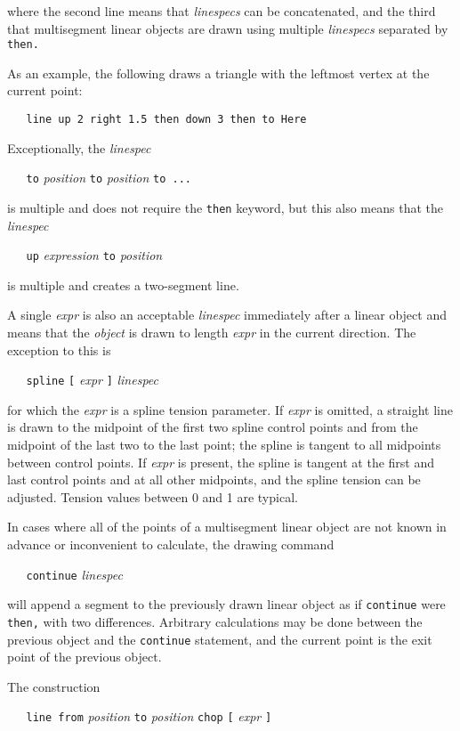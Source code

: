 where
the second line means that
{\it linespecs}
can be concatenated, and the third
that multisegment linear objects are drawn using multiple
{\it linespecs}
separated by
{\tt then.}

As an example, the following draws a triangle with the leftmost vertex
at the current point:

{\tt \ \ \ line\ up\ 2\ right\ 1.5\ then\ down\ 3\ then\ to\ Here}

Exceptionally, the
{\it linespec}

{\tt \ \ \ to}
{\it position}
{\tt to}
{\it position}
{\tt to\ ...}

is multiple and does not require the
{\tt then}
keyword, but this also means that the
{\it linespec}

{\tt \ \ \ up}
{\it expression}
{\tt to}
{\it position}

is multiple and creates a two-segment line.

A single
{\it expr}
is also an acceptable
{\it linespec}
immediately after a linear object and means that the
{\it object}
is drawn to length
{\it expr}
in the current direction.
The exception to this is

{\tt \ \ \ spline}
{\tt [}
{\it expr}
{\tt ]}
{\it linespec}

for which the
{\it expr}
is a spline tension parameter.
If
{\it expr}
is omitted, a straight line is drawn to the midpoint of the first two
spline control points and from the midpoint of the last two to the last
point; the spline is tangent to all midpoints between control points.
If
{\it expr}
is present, the spline is tangent at the first and last control points
and at all other midpoints, and the spline tension can be
adjusted.
Tension values between 0 and 1 are typical.

In cases where all of the points of a multisegment linear object are
not known in advance or inconvenient to calculate, the drawing command

{\tt \ \ \ continue}
{\it linespec}

will append a segment to the previously drawn linear object as if
{\tt continue}
were
{\tt then,}
with two differences.
Arbitrary calculations may be done between the previous object and the
{\tt continue}
statement, and the current point is the exit point of the previous object.

The construction

{\tt \ \ \ line\ from}
{\it position}
{\tt to}
{\it position}
{\tt chop}
{\tt [}
{\it expr}
{\tt ]}


